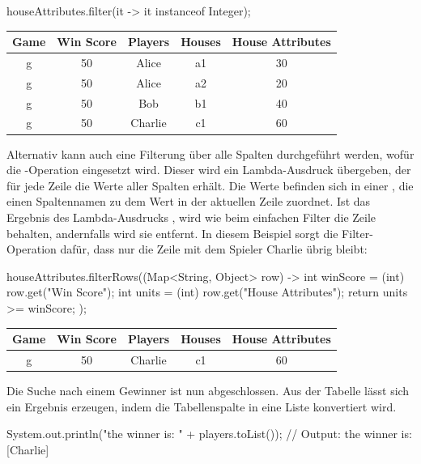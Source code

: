 \begin{jcodeblock}
    houseAttributes.filter(it -> it instanceof Integer);
\end{jcodeblock}

\begin{tabular}{|c|c|c|c|c|}
    \hline
    \textbf{Game} & \textbf{Win Score} & \textbf{Players} & \textbf{Houses} & \textbf{House Attributes} \\
    \hline
    g & 50 & Alice   & a1 & 30      \\
    g & 50 & Alice   & a2 & 20      \\
    g & 50 & Bob     & b1 & 40      \\
    g & 50 & Charlie & c1 & 60      \\
    \hline
\end{tabular}

Alternativ kann auch eine Filterung über alle Spalten durchgeführt werden, wofür die -Operation eingesetzt wird.
Dieser wird ein Lambda-Ausdruck übergeben, der für jede Zeile die Werte aller Spalten erhält.
Die Werte befinden sich in einer , die einen Spaltennamen zu dem Wert in der aktuellen Zeile zuordnet.
Ist das Ergebnis des Lambda-Ausdrucks , wird wie beim einfachen Filter die Zeile behalten, andernfalls wird sie entfernt.
In diesem Beispiel sorgt die Filter-Operation dafür, dass nur die Zeile mit dem Spieler Charlie übrig bleibt:

\begin{jcodeblock}
    houseAttributes.filterRows((Map<String, Object> row) -> {
        int winScore = (int) row.get("Win Score");
        int units = (int) row.get("House Attributes");
        return units >= winScore;
    });
\end{jcodeblock}

\begin{tabular}{|c|c|c|c|c|}
    \hline
    \textbf{Game} & \textbf{Win Score} & \textbf{Players} & \textbf{Houses} & \textbf{House Attributes} \\
    \hline
    g & 50 & Charlie & c1 & 60 \\
    \hline
\end{tabular}

Die Suche nach einem Gewinner ist nun abgeschlossen.
Aus der Tabelle lässt sich ein Ergebnis erzeugen, indem die Tabellenspalte  in eine Liste konvertiert wird.

\begin{jcodeblock}
    System.out.println("the winner is: " + players.toList());
    // Output: the winner is: [Charlie]
\end{jcodeblock}

